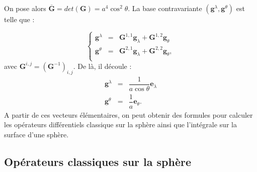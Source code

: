 On pose alors $\overline{\mathbf{G}} = det (\mathbf{G}) = a^4 \cos^2 \theta$. La base contravariante $( \mathbf{g}^{\lambda}, \mathbf{g}^{\theta} ) $ est telle que :

\begin{equation}
\left\lbrace 
\begin{array}{rcl}
\mathbf{g}^{\lambda} & = & \mathbf{G}^{1,1} \mathbf{g}_{\lambda} + \mathbf{G}^{1,2} \mathbf{g}_{\theta} \\
\mathbf{g}^{\theta} & = & \mathbf{G}^{2,1} \mathbf{g}_{\lambda} + \mathbf{G}^{2,2} \mathbf{g}_{\theta}, \\
\end{array}
\right.
\end{equation}
avec $\mathbf{G}^{i,j} = \left( \mathbf{G}^{-1} \right)_{i,j}$.
De là, il découle :
\begin{equation}
\begin{array}{rcl}
\mathbf{g}^{\lambda} & = & \dfrac{1}{a \cos \theta}  \mathbf{e}_{\lambda} \\
\mathbf{g}^{\theta} & = & \dfrac{1}{a} \mathbf{e}_{\theta}.
\end{array}
\end{equation}
A partir de ces vecteurs élémentaires, on peut obtenir des formules pour calculer les opérateurs différentiels classique sur la sphère ainsi que l'intégrale sur la surface d'une sphère.

\subsection{Opérateurs classiques sur la sphère}

